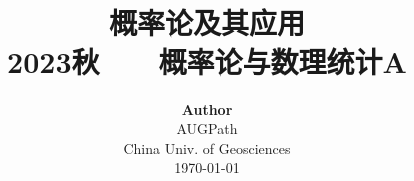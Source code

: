 \title{ \normalsize \textsc{}
		\\ [2.0cm]
		\HRule{1.5pt} \\
		\LARGE \textbf{{概率论及其应用}
		\HRule{2.0pt} \\ [0.6cm] \LARGE{2023秋 ~~~概率论与数理统计A} \vspace*{10\baselineskip}}
		}
\date{}
\author{\textbf{Author} \\ 
		AUGPath \\
		China Univ. of Geosciences \\
		\today}

\maketitle
\newpage
\setcounter{tocdepth}{1}
\tableofcontents
\newpage
